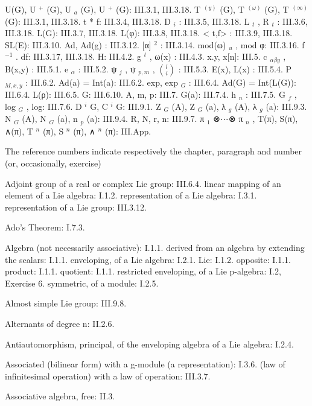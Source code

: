 U(G), U \(^{+}\) (G), U \(_{a}\) (G), U \(^{+}\) (G): III.3.1, III.3.18. T \(^{(y)}\) (G), T \(^{(\omega)}\) (G), T \(^{(\infty)}\) (G): III.3.1, III.3.18. t * f: III.3.4, III.3.18. D \(_{i}\) : III.3.5, III.3.18. L \(_{t}\) , R \(_{t}\) : III.3.6, III.3.18. L(G): III.3.7, III.3.18. L(φ): III.3.8, III.3.18. \textless{} t,f\textgreater{} : III.3.9, III.3.18. SL(E): III.3.10. Ad, Ad(g) : III.3.12. {[}α{]} \(^{2}\) : III.3.14. mod(ω) \(_{u}\) , mod φ: III.3.16. f \(^{-1}\) . df: III.3.17, III.3.18. H: III.4.2. g \(^{t}\) , ω(x) : III.4.3. x.y, x{[}n{]}: III.5. c \(_{\alpha\beta y}\) , B(x,y) : III.5.1. e \(_{\alpha}\) : III.5.2. ψ \(_{j}\) , ψ \(_{p,m}\) , \(\binom{l}{i}\) : III.5.3. E(x), L(x) : III.5.4. P \(_{M,x,y}\) : III.6.2. Ad(a) = Int(a): III.6.2. exp, exp \(_{G}\) : III.6.4. Ad(G) = Int(L(G)): III.6.4. L(ρ): III.6.5. G: III.6.10. A, m, p: III.7. G(a): III.7.4. h \(_{n}\) : III.7.5. G \(_{f}\) , log \(_{G}\) , log: III.7.6. D \(^{i}\) G, C \(^{i}\) G: III.9.1. Z \(_{G}\) (A), Z \(_{G}\) (a), λ \(_{g}\) (A), λ \(_{g}\) (a): III.9.3. N \(_{G}\) (A), N \(_{G}\) (a), n \(_{p}\) (a): III.9.4. R, N, r, n: III.9.7. π \(_{1}\) ⊗⋯⊗ π \(_{n}\) , T(π), S(π), ∧(π), T \(^{n}\) (π), S \(^{n}\) (π), ∧ \(^{n}\) (π): III.App.


The reference numbers indicate respectively the chapter, paragraph and number (or, occasionally, exercise)

Adjoint group of a real or complex Lie group: III.6.4. linear mapping of an element of a Lie algebra: I.1.2. representation of a Lie algebra: I.3.1. representation of a Lie group: III.3.12.

Ado's Theorem: I.7.3.

Algebra (not necessarily associative): I.1.1. derived from an algebra by extending the scalars: I.1.1. enveloping, of a Lie algebra: I.2.1. Lie: I.1.2. opposite: I.1.1. product: I.1.1. quotient: I.1.1. restricted enveloping, of a Lie p-algebra: I.2, Exercise 6. symmetric, of a module: I.2.5.

Almost simple Lie group: III.9.8.

Alternants of degree n: II.2.6.

Antiautomorphism, principal, of the enveloping algebra of a Lie algebra: I.2.4.

Associated (bilinear form) with a g-module (a representation): I.3.6. (law of infinitesimal operation) with a law of operation: III.3.7.

Associative algebra, free: II.3.

